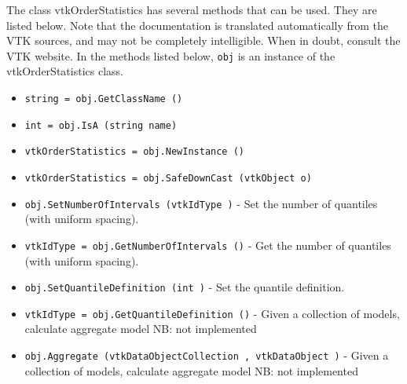 The class vtkOrderStatistics has several methods that can be used.
  They are listed below.
Note that the documentation is translated automatically from the VTK sources,
and may not be completely intelligible.  When in doubt, consult the VTK website.
In the methods listed below, \verb|obj| is an instance of the vtkOrderStatistics class.
\begin{itemize}
\item  \verb|string = obj.GetClassName ()|

\item  \verb|int = obj.IsA (string name)|

\item  \verb|vtkOrderStatistics = obj.NewInstance ()|

\item  \verb|vtkOrderStatistics = obj.SafeDownCast (vtkObject o)|

\item  \verb|obj.SetNumberOfIntervals (vtkIdType )| -  Set the number of quantiles (with uniform spacing).

\item  \verb|vtkIdType = obj.GetNumberOfIntervals ()| -  Get the number of quantiles (with uniform spacing).

\item  \verb|obj.SetQuantileDefinition (int )| -  Set the quantile definition.

\item  \verb|vtkIdType = obj.GetQuantileDefinition ()| -  Given a collection of models, calculate aggregate model
 NB: not implemented

\item  \verb|obj.Aggregate (vtkDataObjectCollection , vtkDataObject )| -  Given a collection of models, calculate aggregate model
 NB: not implemented

\end{itemize}
